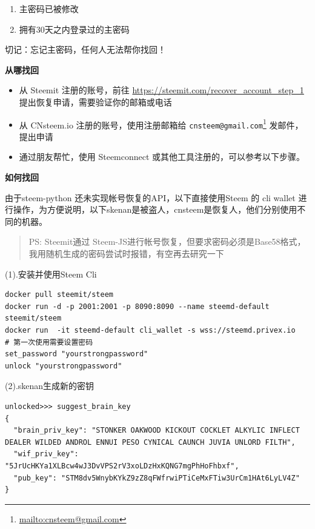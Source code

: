 \documentclass[]{ctexbook}
\providecommand{\tightlist}{%
  \setlength{\itemsep}{0pt}\setlength{\parskip}{0pt}}
\renewcommand{\href}[2]{#2\footnote{\url{#1}}}
\begin{document}
\begin{enumerate}
\def\labelenumi{\arabic{enumi}.}
\tightlist
\item
  主密码已被修改
\item
  拥有30天之内登录过的主密码
\end{enumerate}

切记：忘记主密码，任何人无法帮你找回！

\textbf{从哪找回}

\begin{itemize}
\tightlist
\item
  从 Steemit 注册的账号，前往 \url{https://steemit.com/recover_account_step_1} 提出恢复申请，需要验证你的邮箱或电话
\item
  从 CNsteem.io 注册的账号，使用注册邮箱给 \href{mailto:cnsteem@gmail.com}{\nolinkurl{cnsteem@gmail.com}} 发邮件，提出申请
\item
  通过朋友帮忙，使用 Steemconnect 或其他工具注册的，可以参考以下步骤。
\end{itemize}

\textbf{如何找回}

由于steem-python 还未实现帐号恢复的API，以下直接使用Steem 的 cli wallet 进行操作，为方便说明，以下skenan是被盗人，cnsteem是恢复人，他们分别使用不同的机器。

\begin{quote}
PS: Steemit通过 Steem-JS进行帐号恢复，但要求密码必须是Base58格式，我用随机生成的密码尝试时报错，有空再去研究一下
\end{quote}

(1).安装并使用Steem Cli

\begin{verbatim}
docker pull steemit/steem
docker run -d -p 2001:2001 -p 8090:8090 --name steemd-default steemit/steem
docker run  -it steemd-default cli_wallet -s wss://steemd.privex.io
# 第一次使用需要设置密码
set_password "yourstrongpassword"
unlock "yourstrongpassword"
\end{verbatim}

(2).skenan生成新的密钥

\begin{verbatim}
unlocked>>> suggest_brain_key
{
  "brain_priv_key": "STONKER OAKWOOD KICKOUT COCKLET ALKYLIC INFLECT DEALER WILDED ANDROL ENNUI PESO CYNICAL CAUNCH JUVIA UNLORD FILTH",
  "wif_priv_key": "5JrUcHKYa1XLBcw4wJ3DvVPS2rV3xoLDzHxKQNG7mgPhHoFhbxf",
  "pub_key": "STM8dv5WnybKYkZ9zZ8qFWfrwiPTiCeMxFTiw3UrCm1HAt6LyLV4Z"
}
\end{verbatim}
\end{document}
